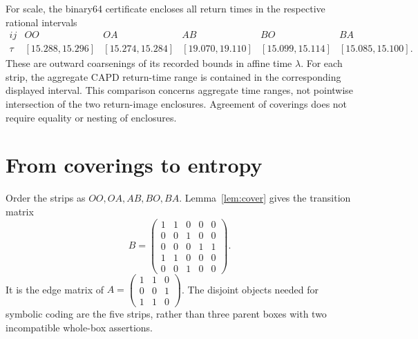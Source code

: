 For scale, the binary64 certificate encloses all return times in the
respective rational intervals
\[
\begin{array}{c|ccccc}
 ij&OO&OA&AB&BO&BA\\\hline
 \tau&[15.288,15.296]&[15.274,15.284]&[19.070,19.110]&
 [15.099,15.114]&[15.085,15.100].
\end{array}
\]
These are outward coarsenings of its recorded bounds in affine time
$\lambda$. For each strip, the aggregate CAPD return-time range is contained in the
corresponding displayed interval. This comparison concerns aggregate time
ranges, not pointwise intersection of the two return-image enclosures.
Agreement of coverings does not require equality or nesting of enclosures.

\section{From coverings to entropy}\label{sec:entropy}

Order the strips as $OO,OA,AB,BO,BA$. Lemma~\ref{lem:cover} gives the transition
matrix
\begin{equation}\label{eq:matrix}
 B=\begin{pmatrix}
 1&1&0&0&0\\
 0&0&1&0&0\\
 0&0&0&1&1\\
 1&1&0&0&0\\
 0&0&1&0&0
 \end{pmatrix}.
\end{equation}
It is the edge matrix of
$A=\left(\begin{smallmatrix}1&1&0\\0&0&1\\1&1&0\end{smallmatrix}\right)$.
The disjoint objects needed for symbolic coding are the five strips, rather
than three parent boxes with two incompatible whole-box assertions.

